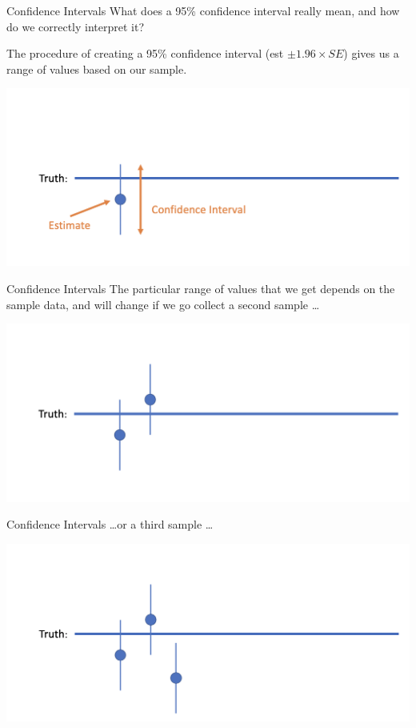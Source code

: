 \documentclass[10pt,t]{beamer}
\begin{document}
\begin{frame}{Confidence Intervals}
What does a 95\% confidence interval really mean, and how do we correctly interpret it?

\vspace{0.3cm}

The procedure of creating a 95\% confidence interval (est $\pm 1.96 \times SE$) gives us a range of values based on our sample.

\centering \includegraphics[scale=0.4]{ci3.png}

\end{frame}

\begin{frame}{Confidence Intervals}
The particular range of values that we get depends on the sample data, and will change if we go collect a second sample \dots

\centering \includegraphics[scale=0.4]{ci4.png}

\end{frame}

\begin{frame}{Confidence Intervals}
\dots or a third sample \dots

\centering \includegraphics[scale=0.4]{ci5.png}

\end{frame}
\end{document}
